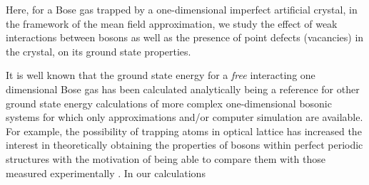 \documentclass[twocolumn,showpacs,showkeys,preprintnumbers,superscriptaddress, pra, 10pt, aps]{revtex4-2}
\begin{document}




%



Here, for a Bose gas trapped by a one-dimensional imperfect artificial crystal, in the framework of  the mean field approximation, we study the effect of weak interactions between bosons as well as  the presence of point defects (vacancies) in the crystal, on its ground state properties.

It is well known that the ground state energy for a {\it free} interacting one dimensional Bose gas has been calculated analytically \cite{LL} being a reference for other ground state energy calculations of more complex one-dimensional bosonic systems for which only approximations and/or computer simulation are available.
For example, the possibility of trapping atoms in optical lattice has increased the interest in theoretically obtaining the properties of bosons within perfect periodic structures with the motivation of being able to compare them with those measured experimentally \cite{Omar, Astrakharchik}. In our calculations
\end{document}
